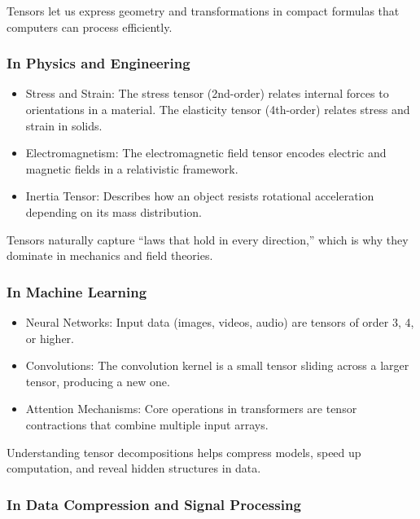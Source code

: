 \documentclass[
  letterpaper,
  DIV=11,
  numbers=noendperiod]{scrreprt}
\providecommand{\tightlist}{%
  \setlength{\itemsep}{0pt}\setlength{\parskip}{0pt}}
\begin{document}
Tensors let us express geometry and transformations in compact formulas
that computers can process efficiently.

\subsubsection{In Physics and
Engineering}\label{in-physics-and-engineering}

\begin{itemize}
\tightlist
\item
  Stress and Strain: The stress tensor (2nd-order) relates internal
  forces to orientations in a material. The elasticity tensor
  (4th-order) relates stress and strain in solids.
\item
  Electromagnetism: The electromagnetic field tensor encodes electric
  and magnetic fields in a relativistic framework.
\item
  Inertia Tensor: Describes how an object resists rotational
  acceleration depending on its mass distribution.
\end{itemize}

Tensors naturally capture ``laws that hold in every direction,'' which
is why they dominate in mechanics and field theories.

\subsubsection{In Machine Learning}\label{in-machine-learning}

\begin{itemize}
\tightlist
\item
  Neural Networks: Input data (images, videos, audio) are tensors of
  order 3, 4, or higher.
\item
  Convolutions: The convolution kernel is a small tensor sliding across
  a larger tensor, producing a new one.
\item
  Attention Mechanisms: Core operations in transformers are tensor
  contractions that combine multiple input arrays.
\end{itemize}

Understanding tensor decompositions helps compress models, speed up
computation, and reveal hidden structures in data.

\subsubsection{In Data Compression and Signal
Processing}\label{in-data-compression-and-signal-processing}
\end{document}

